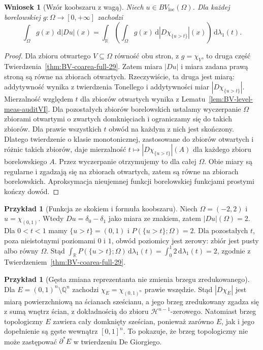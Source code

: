 \documentclass[11pt,a4paper,oneside]{book}
\numberwithin{equation}{chapter}
\theoremstyle{plain}
\newtheorem{wniosek}[twierdzenie]{Wniosek}
\theoremstyle{definition}
\newtheorem{przyklad}[twierdzenie]{Przykład}
\theoremstyle{remark}
\begin{document}
\begin{wniosek}[Wzór koobszaru z wagą]
\label{cor:BV-coarea-weighted-29}
Niech $u\in BV_{\mathrm{loc}}(\Omega)$.
Dla każdej borelowskiej $g:\Omega\to[0,+\infty]$
zachodzi
\[
 \int_\Omega g(x)\,\mathrm d|Du|(x)
 =\int_{\mathbb R}\left(\int_\Omega g(x)
 \,\mathrm d|D\chi_{\{u>t\}}|(x)\right)
 \,\mathrm d\lambda_1(t).
\]
\end{wniosek}
\begin{proof}
Dla zbioru otwartego $V\subseteq\Omega$
równość obu stron, z $g=\chi_V$, to druga
część Twierdzenia~\ref{thm:BV-coarea-full-29}.
Zatem miara $|Du|$ i miara zadana prawą
stroną są równe na zbiorach otwartych.
Rzeczywiście, ta druga jest miarą: addytywność
wynika z twierdzenia Tonellego i addytywności
miar $|D\chi_{\{u>t\}}|$. Mierzalność względem
$t$ dla zbiorów otwartych wynika z
Lematu~\ref{lem:BV-level-meas-auditVI}.
Dla pozostałych zbiorów borelowskich ustalamy
wyczerpanie $\Omega$ zbiorami otwartymi o zwartych
domknięciach i ograniczamy się do takich zbiorów.
Dla prawie wszystkich $t$ obwód na każdym z nich
jest skończony. Dlatego twierdzenie o klasie
monotonicznej, zastosowane do zbiorów otwartych
i różnic takich zbiorów, daje mierzalność
$t\mapsto|D\chi_{\{u>t\}}|(A)$ dla każdego
zbioru borelowskiego $A$. Przez wyczerpanie
otrzymujemy to dla całej $\Omega$.
Obie miary są regularne i zgadzają się na
zbiorach otwartych, zatem są równe na
zbiorach borelowskich. Aproksymacja
nieujemnej funkcji borelowskiej funkcjami
prostymi kończy dowód.
\end{proof}

\begin{przyklad}[Funkcja ze skokiem i formuła koobszaru]
Niech $\Omega=(-2,2)$ i $u=\chi_{(0,1)}$.
Wtedy $Du=\delta_0-\delta_1$ jako miara
ze znakiem, zatem $|Du|(\Omega)=2$.
Dla $0<t<1$ mamy $\{u>t\}=(0,1)$ i
$P(\{u>t\};\Omega)=2$. Dla pozostałych
$t$, poza nieistotnymi poziomami $0$ i $1$,
obwód poziomicy jest zerowy: zbiór jest
pusty albo równy $\Omega$. Stąd
$\int_{\mathbb R}P(\{u>t\};\Omega)
\,\mathrm d\lambda_1(t)=\int_0^1 2\,
\mathrm d\lambda_1(t)=2$, zgodnie z
Twierdzeniem~\ref{thm:BV-coarea-full-29}.
\end{przyklad}

\begin{przyklad}[Gęsta zmiana reprezentanta nie zmienia brzegu zredukowanego]
Dla $E=(0,1)^n\setminus\mathbb Q^n$
zachodzi $\chi_E=\chi_{(0,1)^n}$ prawie wszędzie.
Stąd $|D\chi_E|$ jest miarą powierzchniową
na ścianach sześcianu, a jego brzeg zredukowany
zgadza się z sumą wnętrz ścian, z dokładnością
do zbioru $\mathcal H^{n-1}$-zerowego.
Natomiast brzeg topologiczny $E$ zawiera
cały domknięty sześcian, ponieważ zarówno
$E$, jak i jego dopełnienie są gęste
wewnątrz $[0,1]^n$. To pokazuje, że
brzeg topologiczny nie może zastępować
$\partial^*E$ w twierdzeniu De Giorgiego.
\end{przyklad}
\end{document}
